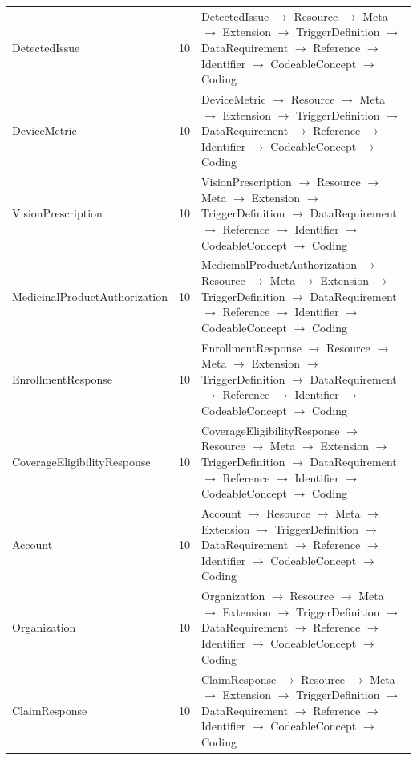 \begin{longtable}{lrl}
DetectedIssue & 10 & DetectedIssue $\rightarrow$ Resource $\rightarrow$ Meta $\rightarrow$ Extension $\rightarrow$ TriggerDefinition $\rightarrow$ DataRequirement $\rightarrow$ Reference $\rightarrow$ Identifier $\rightarrow$ CodeableConcept $\rightarrow$ Coding \\
DeviceMetric & 10 & DeviceMetric $\rightarrow$ Resource $\rightarrow$ Meta $\rightarrow$ Extension $\rightarrow$ TriggerDefinition $\rightarrow$ DataRequirement $\rightarrow$ Reference $\rightarrow$ Identifier $\rightarrow$ CodeableConcept $\rightarrow$ Coding \\
VisionPrescription & 10 & VisionPrescription $\rightarrow$ Resource $\rightarrow$ Meta $\rightarrow$ Extension $\rightarrow$ TriggerDefinition $\rightarrow$ DataRequirement $\rightarrow$ Reference $\rightarrow$ Identifier $\rightarrow$ CodeableConcept $\rightarrow$ Coding \\
MedicinalProductAuthorization & 10 & MedicinalProductAuthorization $\rightarrow$ Resource $\rightarrow$ Meta $\rightarrow$ Extension $\rightarrow$ TriggerDefinition $\rightarrow$ DataRequirement $\rightarrow$ Reference $\rightarrow$ Identifier $\rightarrow$ CodeableConcept $\rightarrow$ Coding \\
EnrollmentResponse & 10 & EnrollmentResponse $\rightarrow$ Resource $\rightarrow$ Meta $\rightarrow$ Extension $\rightarrow$ TriggerDefinition $\rightarrow$ DataRequirement $\rightarrow$ Reference $\rightarrow$ Identifier $\rightarrow$ CodeableConcept $\rightarrow$ Coding \\
CoverageEligibilityResponse & 10 & CoverageEligibilityResponse $\rightarrow$ Resource $\rightarrow$ Meta $\rightarrow$ Extension $\rightarrow$ TriggerDefinition $\rightarrow$ DataRequirement $\rightarrow$ Reference $\rightarrow$ Identifier $\rightarrow$ CodeableConcept $\rightarrow$ Coding \\
Account & 10 & Account $\rightarrow$ Resource $\rightarrow$ Meta $\rightarrow$ Extension $\rightarrow$ TriggerDefinition $\rightarrow$ DataRequirement $\rightarrow$ Reference $\rightarrow$ Identifier $\rightarrow$ CodeableConcept $\rightarrow$ Coding \\
Organization & 10 & Organization $\rightarrow$ Resource $\rightarrow$ Meta $\rightarrow$ Extension $\rightarrow$ TriggerDefinition $\rightarrow$ DataRequirement $\rightarrow$ Reference $\rightarrow$ Identifier $\rightarrow$ CodeableConcept $\rightarrow$ Coding \\
ClaimResponse & 10 & ClaimResponse $\rightarrow$ Resource $\rightarrow$ Meta $\rightarrow$ Extension $\rightarrow$ TriggerDefinition $\rightarrow$ DataRequirement $\rightarrow$ Reference $\rightarrow$ Identifier $\rightarrow$ CodeableConcept $\rightarrow$ Coding \\

\end{longtable}
